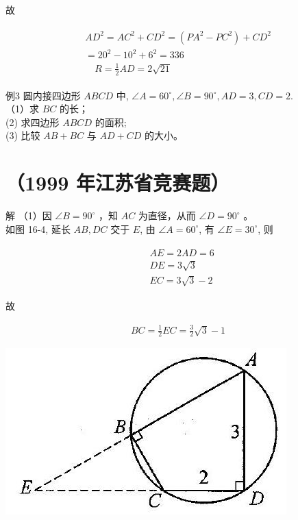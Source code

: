 \documentclass[10pt]{article}
\begin{document}
故

\begin{align*}
\begin{gathered}
A D^{2}=A C^{2}+C D^{2}=\left(P A^{2}-P C^{2}\right)+C D^{2} \\
=20^{2}-10^{2}+6^{2}=336 \\
\quad R=\frac{1}{2} A D=2 \sqrt{21}
\end{gathered}
\end{align*}

例3 圆内接四边形 $A B C D$ 中, $\angle A=60^{\circ}, \angle B=90^{\circ}, A D=3, C D=2$.\\
（1）求 $B C$ 的长；\\
(2) 求四边形 $A B C D$ 的面积;\\
(3) 比较 $A B+B C$ 与 $A D+C D$ 的大小。

\section*{（1999 年江苏省竞赛题）}
解 （1）因 $\angle B=90^{\circ}$ ，知 $A C$ 为直径，从而 $\angle D=90^{\circ}$ 。\\
如图 16-4, 延长 $A B, D C$ 交于 $E$, 由 $\angle A=60^{\circ}$, 有 $\angle E=30^{\circ}$, 则

\begin{align*}
\begin{aligned}
& A E=2 A D=6 \\
& D E=3 \sqrt{3} \\
& E C=3 \sqrt{3}-2
\end{aligned}
\end{align*}

故

\begin{align*}
B C=\frac{1}{2} E C=\frac{3}{2} \sqrt{3}-1
\end{align*}

\begin{center}
\includegraphics[max width=\textwidth]{2024_10_30_2c8f45efd4a519b08e1ag-149}
\end{center}
\end{document}
